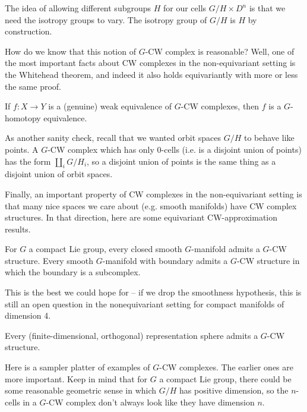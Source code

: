 The idea of allowing different subgroups $H$ for our cells $G/H \times D^n$ is that we need the isotropy groups to vary. The isotropy group of $G/H$ is $H$ by construction. 

How do we know that this notion of $G$-CW complex is reasonable? Well, one of the most important facts about CW complexes in the non-equivariant setting is the Whitehead theorem, and indeed it also holds equivariantly with more or less the same proof.

\begin{thm}[Whitehead]
    If $f: X \to Y$ is a (genuine) weak equivalence of $G$-CW complexes, then $f$ is a $G$-homotopy equivalence.
\end{thm}

As another sanity check, recall that we wanted orbit spaces $G/H$ to behave like points. A $G$-CW complex which has only 0-cells (i.e. is a disjoint union of points) has the form $\coprod_i G/H_i$, so a disjoint union of points is the same thing as a disjoint union of orbit spaces. 

Finally, an important property of CW complexes in the non-equivariant setting is that many nice spaces we care about (e.g. smooth manifolds) have CW complex structures. In that direction, here are some equivariant CW-approximation results. 

\begin{prop}
    For $G$ a compact Lie group, every closed smooth $G$-manifold admits a $G$-CW structure. Every smooth $G$-manifold with boundary admits a $G$-CW structure in which the boundary is a subcomplex.
\end{prop}

This is the best we could hope for -- if we drop the smoothness hypothesis, this is still an open question in the nonequivariant setting for compact manifolds of dimension 4.

\begin{prop}
    Every (finite-dimensional, orthogonal) representation sphere admits a $G$-CW structure.
\end{prop}

Here is a sampler platter of examples of $G$-CW complexes. The earlier ones are more important. Keep in mind that for $G$ a compact Lie group, there could be some reasonable geometric sense in which $G/H$ has positive dimension, so the $n$-cells in a $G$-CW complex don't always look like they have dimension $n$. 

